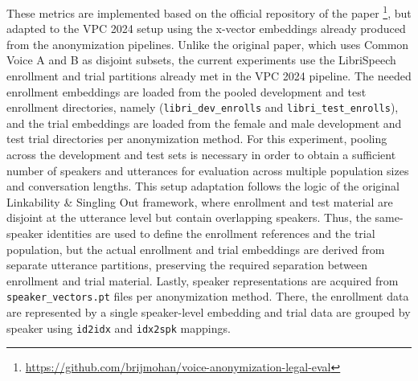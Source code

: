 \documentclass[12pt,leqno,a4paper]{article}
\begin{document}
These metrics are implemented based on the official
repository of the paper \footnote{\url{https://github.com/brijmohan/voice-anonymization-legal-eval}}, but adapted to the VPC 2024 setup using the x-vector embeddings already produced from the anonymization pipelines. Unlike the original paper, which uses Common Voice A and B as disjoint subsets, the current experiments use the LibriSpeech enrollment and trial partitions already met in the VPC 2024 pipeline. The needed enrollment embeddings are loaded from the pooled development and test enrollment directories, namely
(\texttt{libri\_dev\_enrolls} and \texttt{libri\_test\_enrolls}), and the
trial embeddings are loaded from the female and male development and test trial
directories per anonymization method. For this experiment, pooling across the development and test sets is necessary in order to obtain a sufficient number of speakers and utterances for evaluation across multiple population sizes and conversation lengths. This setup adaptation follows the logic of the original Linkability \& Singling Out framework, where enrollment and test material are disjoint at the utterance level but contain overlapping speakers. Thus, the same-speaker identities are used to define the enrollment references and the trial population, but the actual enrollment and trial embeddings are derived from separate utterance partitions, preserving the required separation between enrollment and trial material. Lastly, speaker representations are acquired from
\texttt{speaker\_vectors.pt} files per anonymization method. There, the enrollment data are represented
by a single speaker-level embedding and trial data are grouped by speaker
using \texttt{id2idx} and \texttt{idx2spk} mappings.
\end{document}

